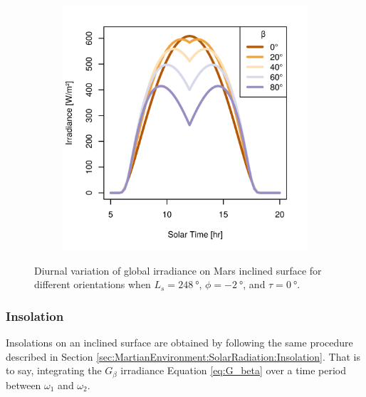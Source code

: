 \begin{figure}[h]
\begin{subfigure}[t]{\subfigureWidth}
  		\label{fig:sub:irradiance-inclined-gamma-c-m180}
  	\end{subfigure}\hfill
	   \begin{subfigure}[t]{\subfigureWidth}
      \centering
  		\includegraphics[height=\graphicsHeight]{sections/martian-environment/plots/gi-variation-4-for-ls-248-phi-2-tau-05-gammac-90-and-albedo-027.png}
  		\label{fig:sub:irradiance-inclined-gamma-c-90}
	   \end{subfigure}\hfill
	\caption{Diurnal variation of global irradiance on Mars inclined surface for different orientations when $L_{s} = \SI{248}{\degree}$, $\phi = \SI{-2}{\degree}$, and $\tau = \SI{0}{\degree}$.}
	\label{fig:plot:irradiance-inclined-gamma-c}
\vspace{-2ex}
\end{figure}

\clearpage
\subsubsection{Insolation}
\label{sec:MartianEnvironment:SolarRadiation:InclinedSurface:Insolation}

Insolations on an inclined surface are obtained by following the same procedure described in Section \ref{sec:MartianEnvironment:SolarRadiation:Insolation}. That is to say, integrating the $G_{\beta}$ irradiance Equation \ref{eq:G_beta} over a time period between $\omega_1$ and $\omega_2$.


